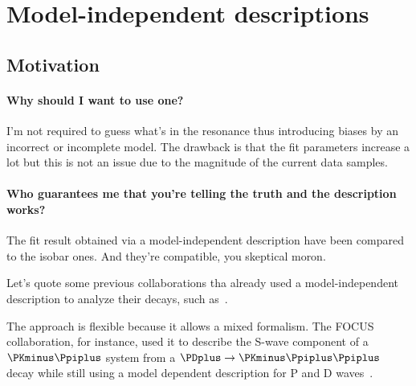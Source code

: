     \section{Model-independent descriptions}

    \subsection{Motivation}

    \paragraph{Why should I want to use one?}

    I'm not required to guess what's in the resonance thus introducing biases by an incorrect or incomplete model.
    The drawback is that the fit parameters increase a lot but this is not an issue due to the magnitude of the current data samples.


    \paragraph{Who guarantees me that you're telling the truth and the description works?}

    The fit result obtained via a model-independent description have been compared to the isobar ones.
    And they're compatible, you skeptical moron.


    Let's quote some previous collaborations tha already used a model-independent description to analyze their decays, such as~\cite{PhysRevD.73.032004,Link200914}.


    The approach is flexible because it allows a mixed formalism.
    The {\small FOCUS} collaboration, for instance, used it to describe the S-wave component of a $\PKminus\Ppiplus$ system from a $\PDplus \to \PKminus\Ppiplus\Ppiplus$ decay while still using a model dependent description for P and D waves~\cite{Link200914}.


